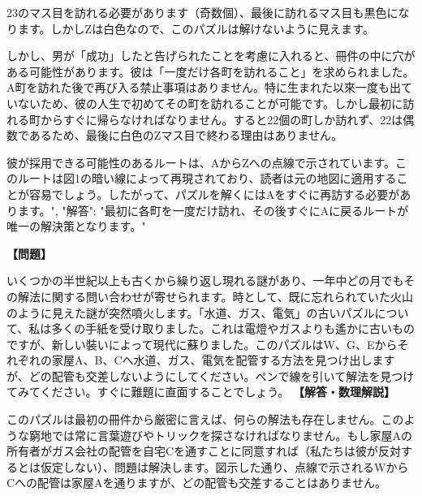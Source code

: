 \documentclass[10pt,a4paper,oneside,openany]{ltjsbook}
\begin{document}
\begin{tcolorbox}[colback=softblue,colframe=primaryblue,title=\textbf{第 250 問：THE GRAND TOUR.},arc=2mm,boxrule=1pt,breakable]
{23のマス目を訪れる必要があります（奇数個）、最後に訪れるマス目も黒色になります。しかしZは白色なので、このパズルは解けないように見えます。

しかし、男が「成功」したと告げられたことを考慮に入れると、冊件の中に穴がある可能性があります。彼は「一度だけ各町を訪れること」を求められました。A町を訪れた後で再び入る禁止事項はありません。特に生まれた以來一度も出ていないため、彼の人生で初めてその町を訪れることが可能です。しかし最初に訪れる町からすぐに帰らなければなりません。すると22個の町しか訪れず、22は偶数であるため、最後に白色のZマス目で終わる理由はありません。

彼が採用できる可能性のあるルートは、AからZへの点線で示されています。このルートは図1の暗い線によって再現されており、読者は元の地図に適用することが容易でしょう。したがって、パズルを解くにはAをすぐに再訪する必要があります。",
"解答": "最初に各町を一度だけ訪れ、その後すぐにAに戻るルートが唯一の解決策となります。"
}
\end{tcolorbox}

\begin{tcolorbox}[colback=softblue,colframe=primaryblue,title=\textbf{第 251 問：水道、ガス、電気の配管 （原題: WATER, GAS, AND ELECTRICITY.）},arc=2mm,boxrule=1pt,breakable]
\textbf{【問題】}\par\vspace{0.3em}
いくつかの半世紀以上も古くから繰り返し現れる謎があり、一年中どの月でもその解法に関する問い合わせが寄せられます。時として、既に忘れられていた火山のように見えた謎が突然噴火します。「水道、ガス、電気」の古いパズルについて、私は多くの手紙を受け取りました。これは電燈やガスよりも遙かに古いものですが、新しい裝いによって現代に蘇りました。このパズルはW、G、Eからそれぞれの家屋A、B、Cへ水道、ガス、電気を配管する方法を見つけ出しますが、どの配管も交差しないようにしてください。ペンで線を引いて解法を見つけてみてください。すぐに難題に直面することでしょう。
\tcblower
\textbf{【解答・数理解説】}\par\vspace{0.3em}
このパズルは最初の冊件から厳密に言えば、何らの解法も存在しません。このような窮地では常に言葉遊びやトリックを探さなければなりません。もし家屋Aの所有者がガス会社の配管を自宅Cを通すことに同意すれば（私たちは彼が反対するとは仮定しない）、問題は解決します。図示した通り、点線で示されるWからCへの配管は家屋Aを通りますが、どの配管も交差することはありません。
\end{tcolorbox}
\end{document}
